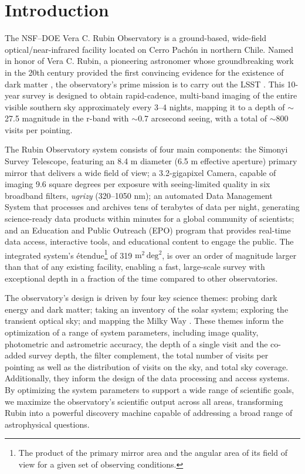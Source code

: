 \section{Introduction
\label{sec:intro}}
The NSF–DOE Vera C. Rubin Observatory is a ground-based, wide-field optical/near-infrared facility located on Cerro Pach\'on in northern Chile.  
Named in honor of Vera C. Rubin, a pioneering astronomer whose groundbreaking work in the 20th century provided the first convincing evidence for the existence of dark matter \citep{1970ApJ...159..379R, 1980ApJ...238..471R}, the observatory’s prime mission is to carry out the \gls{LSST} \citep{2019ApJ...873..111I}.
This 10-year survey is designed to obtain rapid-cadence, multi-band imaging of the entire visible southern sky approximately every 3–4 nights, mapping it to a depth of $\sim$ 27.5 magnitude in the r-band with $\sim$0.7 arcsecond seeing, with a total of $\sim$800 visits per pointing.

The Rubin Observatory system consists of four main components: the Simonyi Survey Telescope, featuring an 8.4 m diameter (6.5 m effective aperture) primary mirror that delivers a wide field of view; a 3.2-gigapixel Camera, capable of imaging 9.6 square degrees per exposure with seeing-limited quality in six broadband filters, \textit{ugrizy} (320–1050 nm); an automated Data Management System that processes and archives tens of terabytes of data per night, generating science-ready data products within minutes for a global community of scientists; and an Education and Public Outreach (EPO) program that provides real-time data access, interactive tools, and educational content to engage the public. 
The integrated system's \'etendue\footnote{The product of the primary mirror area and the angular area of its field of view for a given set of observing conditions.} of 319 $\text{m}^2 \,\text{deg}^2$, is over an order of magnitude larger than that of any existing facility, enabling a fast, large-scale survey with exceptional depth in a fraction of the time compared to other observatories.

The observatory's design is driven by four key science themes: probing dark energy and dark matter; taking an inventory of the solar system; exploring the transient optical sky; and mapping the Milky Way \citep{2019ApJ...873..111I}.
These themes inform the optimization of a range of system parameters, including image quality, photometric and astrometric accuracy, the depth of a single visit and the co-added survey depth, the filter complement, the total number of visits per pointing as well as the distribution of visits on the sky, and  total sky coverage.
Additionally, they inform the design of the data processing and access systems.
By optimizing the system parameters to support a wide range of scientific goals, we maximize the observatory's scientific output across all areas, transforming Rubin into a powerful discovery machine capable of addressing a broad range of astrophysical questions.

